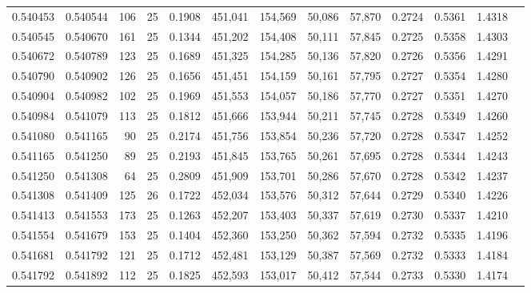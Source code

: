 \begin{tabular}{rrrrrrrrrrrrr}
0.540453 & 0.540544 &   106 &  25 &                                     0.1908 & 451,041 & 154,569 &  50,086 &  57,870 & 0.2724 & 0.5361 & 1.4318 \\
0.540545 & 0.540670 &   161 &  25 &                                     0.1344 & 451,202 & 154,408 &  50,111 &  57,845 & 0.2725 & 0.5358 & 1.4303 \\
0.540672 & 0.540789 &   123 &  25 &                                     0.1689 & 451,325 & 154,285 &  50,136 &  57,820 & 0.2726 & 0.5356 & 1.4291 \\
0.540790 & 0.540902 &   126 &  25 &                                     0.1656 & 451,451 & 154,159 &  50,161 &  57,795 & 0.2727 & 0.5354 & 1.4280 \\
0.540904 & 0.540982 &   102 &  25 &                                     0.1969 & 451,553 & 154,057 &  50,186 &  57,770 & 0.2727 & 0.5351 & 1.4270 \\
0.540984 & 0.541079 &   113 &  25 &                                     0.1812 & 451,666 & 153,944 &  50,211 &  57,745 & 0.2728 & 0.5349 & 1.4260 \\
0.541080 & 0.541165 &    90 &  25 &                                     0.2174 & 451,756 & 153,854 &  50,236 &  57,720 & 0.2728 & 0.5347 & 1.4252 \\
0.541165 & 0.541250 &    89 &  25 &                                     0.2193 & 451,845 & 153,765 &  50,261 &  57,695 & 0.2728 & 0.5344 & 1.4243 \\
0.541250 & 0.541308 &    64 &  25 &                                     0.2809 & 451,909 & 153,701 &  50,286 &  57,670 & 0.2728 & 0.5342 & 1.4237 \\
0.541308 & 0.541409 &   125 &  26 &                                     0.1722 & 452,034 & 153,576 &  50,312 &  57,644 & 0.2729 & 0.5340 & 1.4226 \\
0.541413 & 0.541553 &   173 &  25 &                                     0.1263 & 452,207 & 153,403 &  50,337 &  57,619 & 0.2730 & 0.5337 & 1.4210 \\
0.541554 & 0.541679 &   153 &  25 &                                     0.1404 & 452,360 & 153,250 &  50,362 &  57,594 & 0.2732 & 0.5335 & 1.4196 \\
0.541681 & 0.541792 &   121 &  25 &                                     0.1712 & 452,481 & 153,129 &  50,387 &  57,569 & 0.2732 & 0.5333 & 1.4184 \\
0.541792 & 0.541892 &   112 &  25 &                                     0.1825 & 452,593 & 153,017 &  50,412 &  57,544 & 0.2733 & 0.5330 & 1.4174 \\

\end{tabular}
